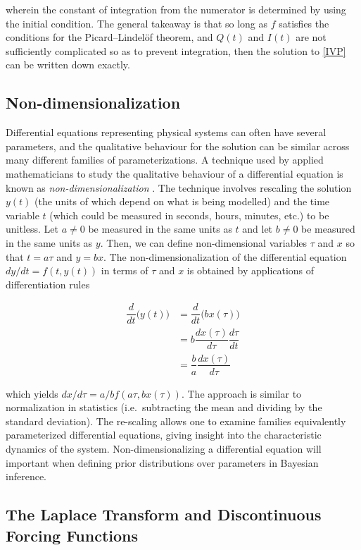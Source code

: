 \noindent wherein the constant of integration from the numerator is determined by using the initial condition. The general takeaway is that so long as $f$ satisfies the conditions for the Picard–Lindelöf theorem, and $Q(t)$ and $I(t)$ are not sufficiently complicated so as to prevent integration, then the solution to \cref{IVP} can be written down exactly.


\subsection{Non-dimensionalization}

Differential equations representing physical systems can often have several parameters, and the qualitative behaviour for the solution can be similar across many different families of parameterizations. A technique used by applied mathematicians to study the qualitative behaviour of a differential equation is known as \textit{non-dimensionalization} \cite[p.~25]{holmes2009introduction}.  The technique involves rescaling the solution $y(t)$ (the units of which depend on what is being modelled) and the time variable $t$ (which could be measured in seconds, hours, minutes, etc.) to be unitless. Let $a \neq 0$ be measured in the same units as $t$ and let $b \neq 0$ be measured in the same units as $y$.  Then, we can define non-dimensional variables $\tau$ and $x$ so that $t = a \tau $ and $y = b x$.  The non-dimensionalization of the differential equation $dy/dt = f(t, y(t))$  in terms of $\tau$ and $x$ is obtained by applications of differentiation rules

\begin{align}
	\dfrac{d }{dt} \Big( y(t) \Big) &=  	\dfrac{d }{dt} \Big( b x(\tau) \Big)\\
													&= b \dfrac{dx(\tau) }{d\tau} \dfrac{d \tau}{dt}\\
													&= \dfrac{b}{a} \dfrac{dx(\tau)}{d\tau}
\end{align}


\noindent which yields $dx / d \tau = a/b f(a\tau, bx(\tau))$.  The approach is similar to normalization in statistics (i.e.\ subtracting the mean and dividing by the standard deviation).  The re-scaling allows one to examine families equivalently parameterized differential equations, giving insight into the characteristic dynamics of the system. Non-dimensionalizing a differential equation will important when defining prior distributions over parameters in Bayesian inference.

\subsection{The Laplace Transform and Discontinuous Forcing Functions}

